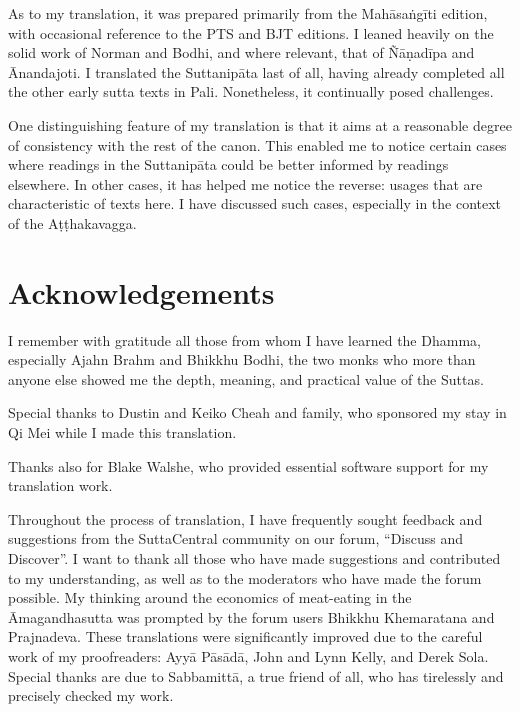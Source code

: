 \documentclass[12pt,openany]{book}%
\begin{document}
As to my translation, it was prepared primarily from the \textsanskrit{Mahāsaṅgīti} edition, with occasional reference to the PTS and BJT editions. I leaned heavily on the solid work of Norman and Bodhi, and where relevant, that of \textsanskrit{Ñāṇadīpa} and Ānandajoti. I translated the \textsanskrit{Suttanipāta} last of all, having already completed all the other early sutta texts in Pali. Nonetheless, it continually posed challenges.

One distinguishing feature of my translation is that it aims at a reasonable degree of consistency with the rest of the canon. This enabled me to notice certain cases where readings in the \textsanskrit{Suttanipāta} could be better informed by readings elsewhere. In other cases, it has helped me notice the reverse: usages that are characteristic of texts here. I have discussed such cases, especially in the context of the \textsanskrit{Aṭṭhakavagga}.

%
\chapter*{Acknowledgements}

I remember with gratitude all those from whom I have learned the Dhamma, especially Ajahn Brahm and Bhikkhu Bodhi, the two monks who more than anyone else showed me the depth, meaning, and practical value of the Suttas.

Special thanks to Dustin and Keiko Cheah and family, who sponsored my stay in Qi Mei while I made this translation.

Thanks also for Blake Walshe, who provided essential software support for my translation work.

Throughout the process of translation, I have frequently sought feedback and suggestions from the SuttaCentral community on our forum, “Discuss and Discover”. I want to thank all those who have made suggestions and contributed to my understanding, as well as to the moderators who have made the forum possible. My thinking around the economics of meat-eating in the Āmagandhasutta was prompted by the forum users Bhikkhu Khemaratana and Prajnadeva. These translations were significantly improved due to the careful work of my proofreaders: \textsanskrit{Ayyā} \textsanskrit{Pāsādā}, John and Lynn Kelly, and Derek Sola. Special thanks are due to \textsanskrit{Sabbamittā}, a true friend of all, who has tirelessly and precisely checked my work. 
\end{document}

